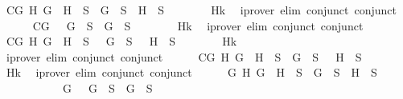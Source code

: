 \begin{isabellebody}
\ C{}{}{\isacharcolon}{\isachardoublequoteopen}{\isasymforall}G\ H{\isachardot}\ G\ \isactrlbold {\isasymand}\ H\ {\isasymin}\ S\ {\isasymlongrightarrow}\ G\ {\isasymin}\ S\ {\isasymand}\ H\ {\isasymin}\ S{\isachardoublequoteclose}\isanewline
\ \ \ \ \ \ \isamarkupfalse%
\ Hk\ \isamarkupfalse%
\ {\isacharparenleft}iprover\ elim{\isacharcolon}\ conjunct{}\ conjunct{}{\isacharparenright}\isanewline
\ \ \ \ \isamarkupfalse%
\ C{}{}{\isacharcolon}{\isachardoublequoteopen}{\isasymforall}G{\isachardot}\ \isactrlbold {\isasymnot}\ {\isacharparenleft}\isactrlbold {\isasymnot}\ G{\isacharparenright}\ {\isasymin}\ S\ {\isasymlongrightarrow}\ G\ {\isasymin}\ S{\isachardoublequoteclose}\isanewline
\ \ \ \ \ \ \isamarkupfalse%
\ Hk\ \isamarkupfalse%
\ {\isacharparenleft}iprover\ elim{\isacharcolon}\ conjunct{}\ conjunct{}{\isacharparenright}\isanewline
\ \ \ \ \isamarkupfalse%
\ C{}{}{\isacharcolon}{\isachardoublequoteopen}{\isasymforall}G\ H{\isachardot}\ \isactrlbold {\isasymnot}{\isacharparenleft}G\ \isactrlbold {\isasymor}\ H{\isacharparenright}\ {\isasymin}\ S\ {\isasymlongrightarrow}\ \isactrlbold {\isasymnot}\ G\ {\isasymin}\ S\ {\isasymand}\ \isactrlbold {\isasymnot}\ H\ {\isasymin}\ S{\isachardoublequoteclose}\isanewline
\ \ \ \ \ \ \isamarkupfalse%
\ Hk\ \isamarkupfalse%
\ {\isacharparenleft}iprover\ elim{\isacharcolon}\ conjunct{}\ conjunct{}{\isacharparenright}\isanewline
\ \ \ \ \isamarkupfalse%
\ C{}{}{\isacharcolon}{\isachardoublequoteopen}{\isasymforall}G\ H{\isachardot}\ \isactrlbold {\isasymnot}{\isacharparenleft}G\ \isactrlbold {\isasymrightarrow}\ H{\isacharparenright}\ {\isasymin}\ S\ {\isasymlongrightarrow}\ G\ {\isasymin}\ S\ {\isasymand}\ \isactrlbold {\isasymnot}\ H\ {\isasymin}\ S{\isachardoublequoteclose}\isanewline
\ \ \ \ \ \ \isamarkupfalse%
\ Hk\ \isamarkupfalse%
\ {\isacharparenleft}iprover\ elim{\isacharcolon}\ conjunct{}\ conjunct{}{\isacharparenright}\isanewline
\ \ \ \ \isamarkupfalse%
\ {\isachardoublequoteopen}{\isacharparenleft}{\isasymforall}G\ H{\isachardot}\ G\ \isactrlbold {\isasymand}\ H\ {\isasymin}\ S\ {\isasymlongrightarrow}\ G\ {\isasymin}\ S\ {\isasymand}\ H\ {\isasymin}\ S{\isacharparenright}\isanewline
\ \ \ \ \ \ \ \ \ \ {\isasymand}\ {\isacharparenleft}{\isasymforall}G{\isachardot}\ \isactrlbold {\isasymnot}\ {\isacharparenleft}\isactrlbold {\isasymnot}\ G{\isacharparenright}\ {\isasymin}\ S\ {\isasymlongrightarrow}\ G\ {\isasymin}\ S{\isacharparenright}\isanewline

\end{isabellebody}
